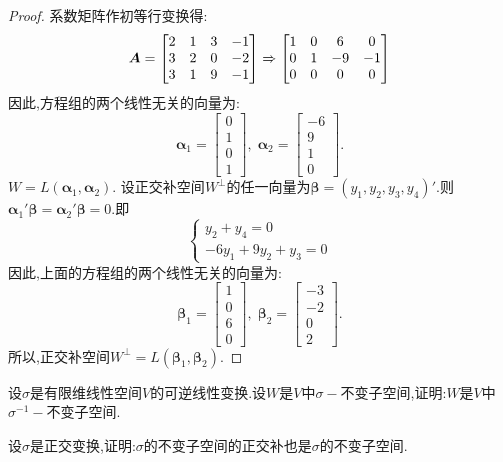 \documentclass[lang=cn,11pt,normal]{elegantbook}
\begin{document}
	\begin{proof}
		系数矩阵作初等行变换得:
		$$
		\boldsymbol{A}=
		\begin{bmatrix}
		2&1&3&-1\\
		3&2&0&-2\\
		3&1&9&-1
		\end{bmatrix}
		\xRightarrow{}
		\begin{bmatrix}
		1&0&6&0\\
		0&1&-9&-1\\
		0&0&0&0
		\end{bmatrix}
		$$
		因此,方程组的两个线性无关的向量为:
		$$
		\boldsymbol{\alpha}_1=
		\begin{bmatrix}
		0\\1\\0\\1
		\end{bmatrix},\;
		\boldsymbol{\alpha}_2=
		\begin{bmatrix}
		-6\\9\\1\\0
		\end{bmatrix}.
		$$
		$W=L(\boldsymbol{\alpha}_1,\boldsymbol{\alpha}_2)$.
		设正交补空间$W^\perp$的任一向量为$\boldsymbol{\beta}=(y_1,y_2,y_3,y_4)'$.则$\boldsymbol{\alpha}_1'\boldsymbol{\beta}=\boldsymbol{\alpha}_2'\boldsymbol{\beta}=0$.即
		$$
		\begin{cases}
		y_2+y_4=0\\
		-6y_1+9y_2+y_3=0
		\end{cases}
		$$
		因此,上面的方程组的两个线性无关的向量为:
		$$
		\boldsymbol{\beta}_1=
		\begin{bmatrix}
		1\\0\\6\\0
		\end{bmatrix},\;
		\boldsymbol{\beta}_2=
		\begin{bmatrix}
		-3\\-2\\0\\2
		\end{bmatrix}.
		$$
		所以,正交补空间$W^\perp=L(\boldsymbol{\beta}_1,\boldsymbol{\beta}_2)$.
	\end{proof}
	\begin{exercise}
		设$\sigma$是有限维线性空间$V$的可逆线性变换.设$W$是$V$中$\sigma-$不变子空间,证明:$W$是$V$中$\sigma^{-1}-$不变子空间.
	\end{exercise}
	\begin{exercise}
		设$\sigma$是正交变换,证明:$\sigma$的不变子空间的正交补也是$\sigma$的不变子空间.
	\end{exercise}
\end{document}
